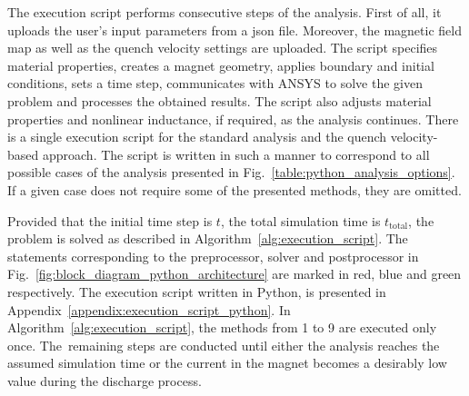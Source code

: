 
The execution script performs consecutive steps of the analysis. First of all, it uploads the user's input parameters from a json file. Moreover, the magnetic field map as well as the quench velocity settings are uploaded. The script specifies material properties, creates a magnet geometry, applies boundary and initial conditions, sets a time step, communicates with ANSYS to solve the given problem and processes the obtained results. The script also adjusts material properties and nonlinear inductance, if required, as the analysis continues. There is a single execution script for the standard analysis and the quench velocity-based approach. The script is written in such a manner to correspond to all possible cases of the analysis presented in Fig.~\ref{table:python_analysis_options}. If a given case does not require some of the presented methods, they are omitted. 

Provided that the initial time step is $t$, the total simulation time is $t_\text{total}$, the problem is solved as described in Algorithm~\ref{alg:execution_script}. The statements corresponding to the preprocessor, solver and postprocessor in Fig.~\ref{fig:block_diagram_python_architecture} are marked in red, blue and green respectively. The execution script written in Python, is presented in Appendix~\ref{appendix:execution_script_python}. In Algorithm~\ref{alg:execution_script}, the methods from 1 to 9 are executed only once. The~remaining steps are conducted until either the analysis reaches the assumed simulation time or the current in the magnet becomes a desirably low value during the discharge process. 


